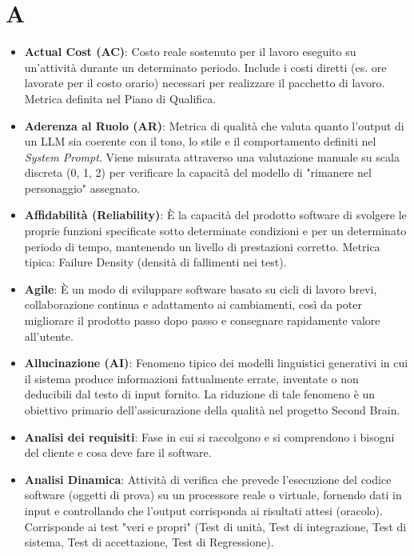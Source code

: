 \documentclass[11pt,a4paper]{article}
\begin{document}
\section*{A}
\begin{itemize}
\item \textbf{Actual Cost (AC)}: Costo reale sostenuto per il lavoro eseguito su un'attività durante un determinato periodo. Include i costi diretti (es. ore lavorate per il costo orario) necessari per realizzare il pacchetto di lavoro. Metrica definita nel Piano di Qualifica.

\item \textbf{Aderenza al Ruolo (AR)}: Metrica di qualità che valuta quanto l'output di un LLM sia coerente con il tono, lo stile e il comportamento definiti nel \textit{System Prompt}. Viene misurata attraverso una valutazione manuale su scala discreta (0, 1, 2) per verificare la capacità del modello di "rimanere nel personaggio" assegnato.

\item \textbf{Affidabilità (Reliability)}: È la capacità del prodotto software di svolgere le proprie funzioni specificate sotto determinate condizioni e per un determinato periodo di tempo, mantenendo un livello di prestazioni corretto.
Metrica tipica: Failure Density (densità di fallimenti nei test).

\item \textbf{Agile}: È un modo di sviluppare software basato su cicli di lavoro brevi, collaborazione continua e adattamento ai cambiamenti, così da poter migliorare il prodotto passo dopo passo e consegnare rapidamente valore all’utente.

\item \textbf{Allucinazione (AI)}: Fenomeno tipico dei modelli linguistici generativi in cui il sistema produce informazioni fattualmente errate, inventate o non deducibili dal testo di input fornito. La riduzione di tale fenomeno è un obiettivo primario dell'assicurazione della qualità nel progetto Second Brain.

\item \textbf{Analisi dei requisiti}: Fase in cui si raccolgono e si comprendono i bisogni del cliente e cosa deve fare il software.

\item \textbf{Analisi Dinamica}: Attività di verifica che prevede l'esecuzione del codice software (oggetti di prova) su un processore reale o virtuale, fornendo dati in input e controllando che l'output corrisponda ai risultati attesi (oracolo). Corrisponde ai test "veri e propri" (Test di unità, Test di integrazione, Test di sistema, Test di accettazione, Test di Regressione).


\end{itemize}
\end{document}
